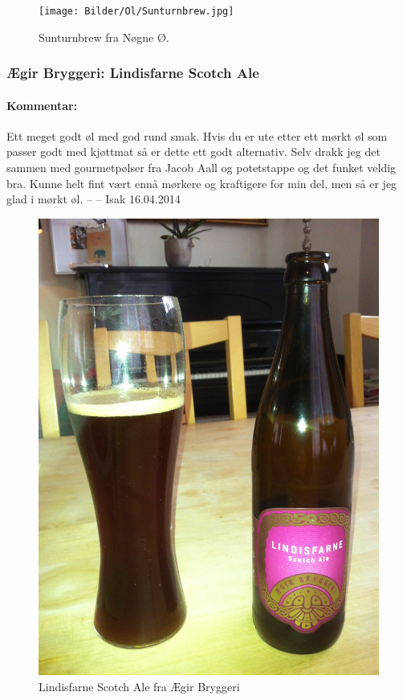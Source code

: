 \documentclass[12pt,a4paper,oneside,norsk]{article}
\begin{document}
\begin{figure} [H] 
\centering
\texttt{[image: Bilder/Ol/Sunturnbrew.jpg]}
\caption{Sunturnbrew fra Nøgne Ø.}
\end{figure}
\newpage

\subsubsection{Ægir Bryggeri: Lindisfarne Scotch Ale}
\paragraph{Kommentar:}Ett meget godt øl med god rund smak. Hvis du er ute etter ett mørkt øl som passer godt med kjøttmat så er dette ett godt alternativ. Selv drakk jeg det sammen med gourmetpølser fra Jacob Aall og potetstappe og det funket veldig bra. Kunne helt fint vært ennå mørkere og kraftigere for min del, men så er jeg glad i mørkt øl.  
\newline
-- -- Isak 16.04.2014

\begin{figure} [H]
\centering
\includegraphics[scale=0.1, angle=270]{Bilder/Ol/lindisfarne}
\caption{Lindisfarne Scotch Ale fra Ægir Bryggeri}
\end{figure}
\end{document}
